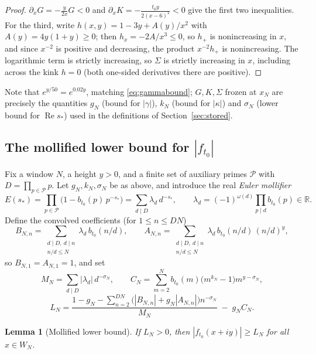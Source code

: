 \documentclass[11pt]{article}
\newtheorem{lemma}[theorem]{Lemma}
\theoremstyle{definition}
\newcommand{\R}{\mathbb{R}}
\newcommand{\calP}{\mathcal{P}}
\DeclareMathOperator{\Rea}{Re}
\begin{document}
\begin{proof}
$\partial_xG=-\frac{y}{2x}G<0$ and
$\partial_xK=-\frac{t_0y}{2(x-6)^2}<0$ give the first two
inequalities. For the third, write
$h(x,y)=1-3y+A(y)/x^2$ with $A(y)=4y(1+y)\ge0$; then
$h_x=-2A/x^3\le0$, so $h_+$ is nonincreasing in $x$, and since
$x^{-2}$ is positive and decreasing, the product $x^{-2}h_+$ is
nonincreasing. The logarithmic term is strictly increasing, so
$\Sigma$ is strictly increasing in $x$, including across the kink
$h=0$ (both one-sided derivatives there are positive).
\end{proof}

Note that $e^{y/50}=e^{0.02y}$, matching \eqref{eq:gammabound}; $G,K,\Sigma$
frozen at $x_N$ are precisely the quantities $g_N$ (bound for
$|\gamma|$), $k_N$ (bound for $|\kappa|$) and $\sigma_N$ (lower bound
for $\Rea s_*$) used in the definitions of Section~\ref{sec:stored}.

\subsection{The mollified lower bound for $|f_{t_0}|$}\label{sec:native}

Fix a window $N$, a height $y>0$, and a finite set of auxiliary primes
$\calP$ with $D=\prod_{p\in\calP}p$. Let $g_N,k_N,\sigma_N$ be as
above, and introduce the real \emph{Euler mollifier}
\[
E(s_*)=\prod_{p\in\calP}\bigl(1-b_{t_0}(p)\,p^{-s_*}\bigr)
=\sum_{d\mid D}\lambda_d\,d^{-s_*},
\qquad
\lambda_d=(-1)^{\omega(d)}\prod_{p\mid d}b_{t_0}(p)\in\R .
\]
Define the convolved coefficients (for $1\le n\le DN$)
\[
B_{N,n}=\sum_{\substack{d\mid D,\ d\mid n\\ n/d\le N}}
\lambda_d\,b_{t_0}(n/d),
\qquad
A_{N,n}=\sum_{\substack{d\mid D,\ d\mid n\\ n/d\le N}}
\lambda_d\,b_{t_0}(n/d)\,(n/d)^y,
\]
so $B_{N,1}=A_{N,1}=1$, and set
\[
M_N=\sum_{d\mid D}|\lambda_d|\,d^{-\sigma_N},
\qquad
C_N=\sum_{m=2}^{N}b_{t_0}(m)\bigl(m^{k_N}-1\bigr)m^{y-\sigma_N},
\]
\begin{equation}\label{eq:LN}
L_N=\frac{1-g_N-\sum_{n=2}^{DN}
\bigl(|B_{N,n}|+g_N|A_{N,n}|\bigr)n^{-\sigma_N}}{M_N}
\;-\;g_NC_N .
\end{equation}

\begin{lemma}[Mollified lower bound]\label{lem:native}
If $L_N>0$, then $|f_{t_0}(x+iy)|\ge L_N$ for all $x\in W_N$.
\end{lemma}
\end{document}
